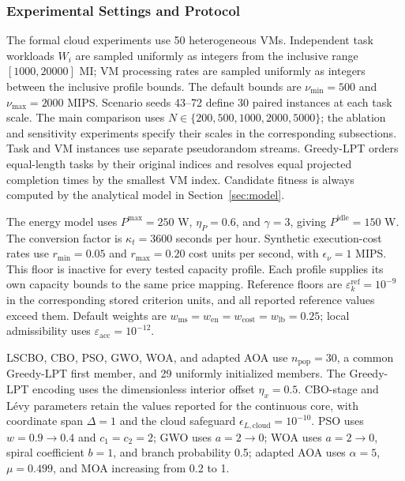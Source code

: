 \documentclass[pdflatex,onecolumn,sn-mathphys-num]{sn-jnl}
\begin{document}
\subsubsection{Experimental Settings and Protocol}\label{sec:cloud_protocol}
The formal cloud experiments use 50 heterogeneous VMs. Independent task workloads $W_i$ are sampled uniformly as integers from the inclusive range $[1000,20000]$ MI; VM processing rates are sampled uniformly as integers between the inclusive profile bounds. The default bounds are $\nu_{\mathrm{min}}=500$ and $\nu_{\mathrm{max}}=2000$ MIPS. Scenario seeds 43--72 define 30 paired instances at each task scale. The main comparison uses $N\in\{200,500,1000,2000,5000\}$; the ablation and sensitivity experiments specify their scales in the corresponding subsections. Task and VM instances use separate pseudorandom streams. Greedy-LPT orders equal-length tasks by their original indices and resolves equal projected completion times by the smallest VM index. Candidate fitness is always computed by the analytical model in Section~\ref{sec:model}.

The energy model uses $P^{\mathrm{max}}=250$ W, $\eta_P=0.6$, and $\gamma=3$, giving $P^{\mathrm{idle}}=150$ W. The conversion factor is $\kappa_t=3600$ seconds per hour. Synthetic execution-cost rates use $r_{\mathrm{min}}=0.05$ and $r_{\mathrm{max}}=0.20$ cost units per second, with $\epsilon_{\nu}=1$ MIPS. This floor is inactive for every tested capacity profile. Each profile supplies its own capacity bounds to the same price mapping. Reference floors are $\varepsilon_k^{\mathrm{ref}}=10^{-9}$ in the corresponding stored criterion units, and all reported reference values exceed them. Default weights are $w_{\mathrm{ms}}=w_{\mathrm{en}}=w_{\mathrm{cost}}=w_{\mathrm{lb}}=0.25$; local admissibility uses $\varepsilon_{\mathrm{acc}}=10^{-12}$.

LSCBO, CBO, PSO, GWO, WOA, and adapted AOA use $n_{\mathrm{pop}}=30$, a common Greedy-LPT first member, and 29 uniformly initialized members. The Greedy-LPT encoding uses the dimensionless interior offset $\eta_x=0.5$. CBO-stage and L\'{e}vy parameters retain the values reported for the continuous core, with coordinate span $\Delta=1$ and the cloud safeguard $\epsilon_{L,\mathrm{cloud}}=10^{-10}$. PSO uses $w=0.9\rightarrow0.4$ and $c_1=c_2=2$; GWO uses $a=2\rightarrow0$; WOA uses $a=2\rightarrow0$, spiral coefficient $b=1$, and branch probability 0.5; adapted AOA uses $\alpha=5$, $\mu=0.499$, and MOA increasing from 0.2 to 1.
\end{document}
